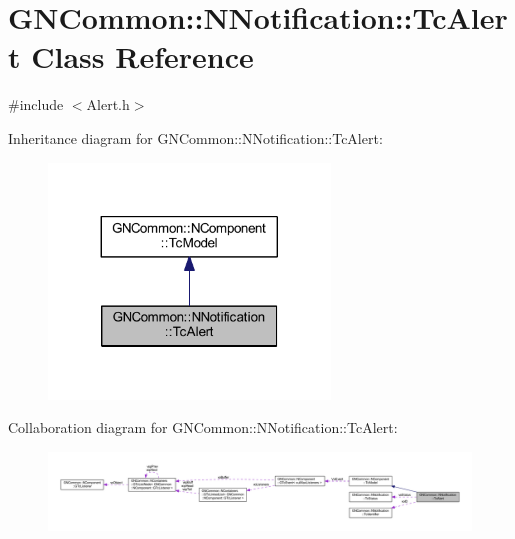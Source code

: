 \hypertarget{class_g_n_common_1_1_n_notification_1_1_tc_alert}{}\section{G\+N\+Common\+:\+:N\+Notification\+:\+:Tc\+Alert Class Reference}
\label{class_g_n_common_1_1_n_notification_1_1_tc_alert}


{\ttfamily \#include $<$Alert.\+h$>$}



Inheritance diagram for G\+N\+Common\+:\+:N\+Notification\+:\+:Tc\+Alert\+:
\nopagebreak
\begin{figure}[H]
\begin{center}
\leavevmode
\includegraphics[width=212pt]{class_g_n_common_1_1_n_notification_1_1_tc_alert__inherit__graph}
\end{center}
\end{figure}


Collaboration diagram for G\+N\+Common\+:\+:N\+Notification\+:\+:Tc\+Alert\+:
\nopagebreak
\begin{figure}[H]
\begin{center}
\leavevmode
\includegraphics[width=350pt]{class_g_n_common_1_1_n_notification_1_1_tc_alert__coll__graph}
\end{center}
\end{figure}
